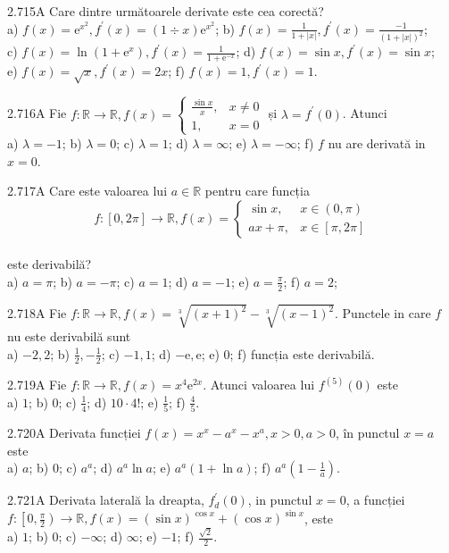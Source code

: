 \documentclass[11pt]{article}
\begin{document}
2.715A Care dintre următoarele derivate este cea corectă?\\ a) $f(x)=\mathrm{e}^{x^{2}}, f^{\prime}(x)=(1 \div x) \mathrm{e}^{x^{2}}$; b) $f(x)=\frac{1}{1+|x|}, f^{\prime}(x)=\frac{-1}{(1+|x|)^{2}}$;\\ c) $f(x)=\ln \left(1+\mathrm{e}^{x}\right), f^{\prime}(x)=\frac{1}{1+\mathrm{e}^{-x}}$; d) $f(x)=\sin x, f^{\prime}(x)=\sin x$;\\ e) $f(x)=\sqrt{x}, f^{\prime}(x)=2 x$; f) $f(x)=1, f^{\prime}(x)=1$.

2.716A Fie $f: \mathbb{R} \rightarrow \mathbb{R}, f(x)=\left\{\begin{array}{ll}\frac{\sin x}{x}, & x \neq 0 \\ 1, & x=0\end{array}\right.$ și $\lambda=f^{\prime}(0)$. Atunci\\ a) $\lambda=-1$; b) $\lambda=0$; c) $\lambda=1$; d) $\lambda=\infty$; e) $\lambda=-\infty$; f) $f$ nu are derivată in $x=0$.

2.717A Care este valoarea lui $a \in \mathbb{R}$ pentru care funcția $$f:[0,2 \pi] \rightarrow \mathbb{R}, f(x)= \begin{cases}\sin x, & x \in(0, \pi) \\ a x+\pi, & x \in[\pi, 2 \pi]\end{cases}$$\\este derivabilă?\\ a) $a=\pi$; b) $a=-\pi$; c) $a=1$; d) $a=-1$; e) $a=\frac{\pi}{2}$; f) $a=2$;

2.718A Fie $f: \mathbb{R} \rightarrow \mathbb{R}, f(x)=\sqrt[3]{(x+1)^{2}}-\sqrt[3]{(x-1)^{2}}$. Punctele in care $f$ nu este derivabilă sunt\\ a) $-2,2$; b) $\frac{1}{2},-\frac{1}{2}$; c) $-1,1$; d) $-\mathrm{e}, \mathrm{e}$; e) $0$; f) funcția este derivabilă.

2.719A Fie $f: \mathbb{R} \rightarrow \mathbb{R}, f(x)=x^{4} \mathrm{e}^{2 x}$. Atunci valoarea lui $f^{(5)}(0)$ este\\ a) $1$; b) $0$; c) $\frac{1}{4}$; d) $10 \cdot 4!$; e) $\frac{1}{5}$; f) $\frac{4}{5}$.

2.720A Derivata funcției $f(x)=x^{x}-a^{x}-x^{a}, x>0, a>0$, în punctul $x=a$ este\\ a) $a$; b) $0$; c) $a^{a}$; d) $a^{a} \ln a$; e) $a^{a}(1+\ln a)$; f) $a^{a}\left(1-\frac{1}{a}\right)$.

2.721A Derivata laterală la dreapta, $f_{d}^{\prime}(0)$, in punctul $x=0$, a funcției $f:\left[0, \frac{\pi}{2}\right) \rightarrow \mathbb{R}, f(x)=(\sin x)^{\cos x}+(\cos x)^{\sin x}$, este\\ a) $1$; b) $0$; c) $-\infty$; d) $\infty$; e) $-1$; f) $\frac{\sqrt{2}}{2}$.
\end{document}

